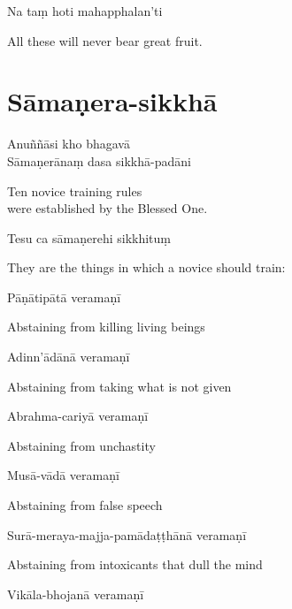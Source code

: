 Na taṃ hoti mahapphalan'ti

\begin{english}
  All these will never bear great fruit.
\end{english}


\section{Sāmaṇera-sikkhā}


Anuññāsi kho bhagavā\\
Sāmaṇerānaṃ dasa sikkhā-padāni

\begin{english}
  Ten novice training rules\\
  were established by the Blessed One.
\end{english}

Tesu ca sāmaṇerehi sikkhituṃ

\begin{english}
  They are the things in which a novice should train:
\end{english}

Pāṇātipātā veramaṇī

\begin{english}
  Abstaining from killing living beings
\end{english}

Adinn'ādānā veramaṇī

\begin{english}
  Abstaining from taking what is not given
\end{english}

Abrahma-cariyā veramaṇī

\begin{english}
  Abstaining from unchastity
\end{english}

Musā-vādā veramaṇī

\begin{english}
  Abstaining from false speech
\end{english}

Surā-meraya-majja-pamādaṭṭhānā veramaṇī

\begin{english}
  Abstaining from intoxicants that dull the mind
\end{english}

Vikāla-bhojanā veramaṇī

